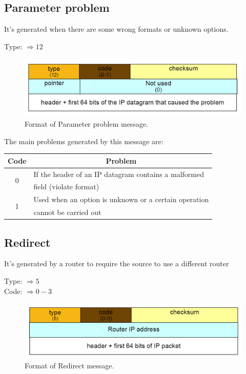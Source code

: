 \subsection{Parameter problem}
It's generated when there are some wrong formats or unknown options. 
\begin{center}
Type: $\Rightarrow 12$\\
\end{center}
\begin{figure}[H]
\centering
\includegraphics[scale=0.35, angle=0]{./Images/ICMP/Parameter_problem}
\caption{\footnotesize{Format of Parameter problem message.}}
\end{figure}
The main problems generated by this message are:
\begin{table}[H]
\centering \footnotesize
\begin{tabular}{|c|l|}
\multicolumn{1}{c}{\textbf{Code}} & \multicolumn{1}{c}{\textbf{Problem}}\\
\hline
\multirow{2}{*}{0} & {If the header of an IP datagram contains a malformed}\\
{}& {field (violate format)}\\
\hline
\multirow{2}{*}{1} & {Used when an option is unknown or a certain operation}\\
{}& {cannot be carried out}\\
\hline
\end{tabular}
\end{table}
\subsection{Redirect}
It's generated by a router to require the source to use a different router
\begin{center}
Type: $\Rightarrow 5$\\
Code: $\Rightarrow 0-3$\\
\end{center}
\begin{figure}[H]
\centering
\includegraphics[scale=0.35, angle=0]{./Images/ICMP/Redirect}
\caption{\footnotesize{Format of Redirect message.}}
\end{figure}

